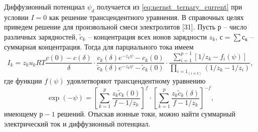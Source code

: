 Диффузионный потенциал \( \psi_d \) получается из
\eqref{eq:nernst_ternary_current} при условии \( I = 0 \) как решение
трансцендентного уравнения. В справочных целях приведем решение для произвольной
смеси электролитов [31]. Пусть р -- число различных зарядностей,
\( \tilde{c}_k \) -- концентрация всех ионов зарядности \( z_k \),
\( с = \sum с_к \) -- суммарная концентрация. Тогда для парциального тока имеем
\begin{equation}
    I_k = z_ku_kRT\frac{c(0) - c(\delta)}{\delta}\cdot
    \frac{c_k(\delta)e^{-z_k\psi}-c_k(0)}
        {\tilde{c}_k(\delta)e^{-z_k\psi}-\tilde{c}_k(0)}\cdot
    \frac{\sum_{i=1}^{p-1}[1/z_k - f_i(\psi)]}
        {\prod_{i=1}_{(i \neq k)}(1/z_k - 1/z_i)},
\end{equation}
где функции \( f(\psi) \) удовлетворяют трансцендентному уравнению
\begin{equation}
    \exp(-\psi) = \left[\sum_{k=1}^p\frac{z_k\tilde{c}_k(0)}{f-1/z_k}\right]^f
    \cdot \left[\sum_{k=1}^p\frac{z_k\tilde{c}_k(\delta)}{f-1/z_k}\right]^{-f},
\end{equation}
имеющему \( р-1 \) решений. Отыскав ионные токи, можно найти суммарный
электрический ток и диффузионный потенциал.

